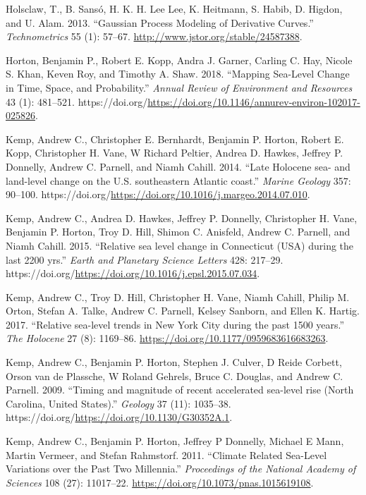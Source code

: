 \begin{CSLReferences}{1}{0}
\leavevmode{}%
Holsclaw, T., B. Sansó, H. K. H. Lee Lee, K. Heitmann, S. Habib, D. Higdon, and U. Alam. 2013. {``Gaussian Process Modeling of Derivative Curves.''} \emph{Technometrics} 55 (1): 57--67. \url{http://www.jstor.org/stable/24587388}.

\leavevmode{}%
Horton, Benjamin P., Robert E. Kopp, Andra J. Garner, Carling C. Hay, Nicole S. Khan, Keven Roy, and Timothy A. Shaw. 2018. {``{Mapping Sea-Level Change in Time, Space, and Probability}.''} \emph{Annual Review of Environment and Resources} 43 (1): 481--521. https://doi.org/\url{https://doi.org/10.1146/annurev-environ-102017-025826}.

\leavevmode{}%
Kemp, Andrew C., Christopher E. Bernhardt, Benjamin P. Horton, Robert E. Kopp, Christopher H. Vane, W Richard Peltier, Andrea D. Hawkes, Jeffrey P. Donnelly, Andrew C. Parnell, and Niamh Cahill. 2014. {``{Late Holocene sea- and land-level change on the U.S. southeastern Atlantic coast}.''} \emph{Marine Geology} 357: 90--100. https://doi.org/\url{https://doi.org/10.1016/j.margeo.2014.07.010}.

\leavevmode{}%
Kemp, Andrew C., Andrea D. Hawkes, Jeffrey P. Donnelly, Christopher H. Vane, Benjamin P. Horton, Troy D. Hill, Shimon C. Anisfeld, Andrew C. Parnell, and Niamh Cahill. 2015. {``{Relative sea level change in Connecticut (USA) during the last 2200 yrs}.''} \emph{Earth and Planetary Science Letters} 428: 217--29. https://doi.org/\url{https://doi.org/10.1016/j.epsl.2015.07.034}.

\leavevmode{}%
Kemp, Andrew C., Troy D. Hill, Christopher H. Vane, Niamh Cahill, Philip M. Orton, Stefan A. Talke, Andrew C. Parnell, Kelsey Sanborn, and Ellen K. Hartig. 2017. {``{Relative sea-level trends in New York City during the past 1500 years}.''} \emph{The Holocene} 27 (8): 1169--86. \url{https://doi.org/10.1177/0959683616683263}.

\leavevmode{}%
Kemp, Andrew C., Benjamin P. Horton, Stephen J. Culver, D Reide Corbett, Orson van de Plassche, W Roland Gehrels, Bruce C. Douglas, and Andrew C. Parnell. 2009. {``{Timing and magnitude of recent accelerated sea-level rise (North Carolina, United States)}.''} \emph{Geology} 37 (11): 1035--38. https://doi.org/\url{https://doi.org/10.1130/G30352A.1}.

\leavevmode{}%
Kemp, Andrew C., Benjamin P. Horton, Jeffrey P Donnelly, Michael E Mann, Martin Vermeer, and Stefan Rahmstorf. 2011. {``Climate Related Sea-Level Variations over the Past Two Millennia.''} \emph{Proceedings of the National Academy of Sciences} 108 (27): 11017--22. \url{https://doi.org/10.1073/pnas.1015619108}.


\end{CSLReferences}
